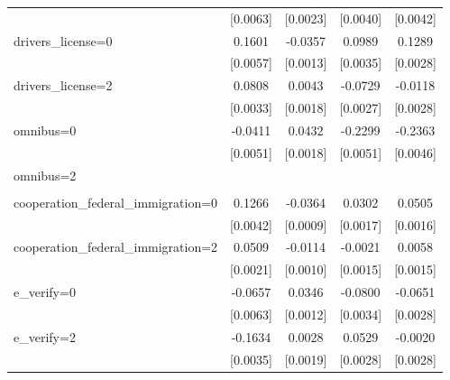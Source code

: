 \begin{table}[htbp]
\begin{tabular}{l*{4}{c}}
                    &    [0.0063]         &    [0.0023]         &    [0.0040]         &    [0.0042]         \\
\addlinespace
drivers\_license=0   &      0.1601\sym{***}&     -0.0357\sym{***}&      0.0989\sym{***}&      0.1289\sym{***}\\
                    &    [0.0057]         &    [0.0013]         &    [0.0035]         &    [0.0028]         \\
\addlinespace
drivers\_license=2   &      0.0808\sym{***}&      0.0043\sym{**} &     -0.0729\sym{***}&     -0.0118\sym{***}\\
                    &    [0.0033]         &    [0.0018]         &    [0.0027]         &    [0.0028]         \\
\addlinespace
omnibus=0           &     -0.0411\sym{***}&      0.0432\sym{***}&     -0.2299\sym{***}&     -0.2363\sym{***}\\
                    &    [0.0051]         &    [0.0018]         &    [0.0051]         &    [0.0046]         \\
\addlinespace
omnibus=2           &                     &                     &                     &                     \\
                    &                     &                     &                     &                     \\
\addlinespace
cooperation\_federal\_immigration=0&      0.1266\sym{***}&     -0.0364\sym{***}&      0.0302\sym{***}&      0.0505\sym{***}\\
                    &    [0.0042]         &    [0.0009]         &    [0.0017]         &    [0.0016]         \\
\addlinespace
cooperation\_federal\_immigration=2&      0.0509\sym{***}&     -0.0114\sym{***}&     -0.0021         &      0.0058\sym{***}\\
                    &    [0.0021]         &    [0.0010]         &    [0.0015]         &    [0.0015]         \\
\addlinespace
e\_verify=0          &     -0.0657\sym{***}&      0.0346\sym{***}&     -0.0800\sym{***}&     -0.0651\sym{***}\\
                    &    [0.0063]         &    [0.0012]         &    [0.0034]         &    [0.0028]         \\
\addlinespace
e\_verify=2          &     -0.1634\sym{***}&      0.0028         &      0.0529\sym{***}&     -0.0020         \\
                    &    [0.0035]         &    [0.0019]         &    [0.0028]         &    [0.0028]         \\

\end{tabular}
\end{table}
